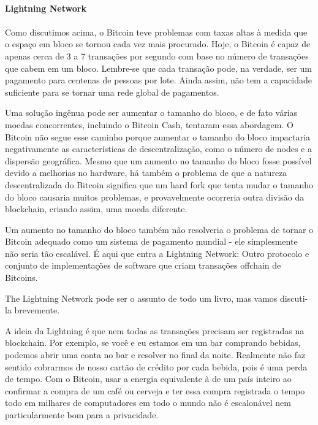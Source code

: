 \paragraph{Lightning Network}
\paragraph{}

Como discutimos acima, o Bitcoin teve problemas com taxas altas à medida que o espaço em bloco se tornou cada vez mais procurado. Hoje, o Bitcoin é capaz de apenas cerca de 3 a 7 transações por segundo com base no número de transações que cabem em um bloco. Lembre-se que cada transação pode, na verdade, ser um pagamento para centenas de pessoas por lote. Ainda assim, não tem a capacidade suficiente para se tornar uma rede global de pagamentos.

Uma solução ingênua pode ser aumentar o tamanho do bloco, e de fato várias moedas concorrentes, incluindo o Bitcoin Cash, tentaram essa abordagem. O Bitcoin não segue esse caminho porque aumentar o tamanho do bloco impactaria negativamente as características de descentralização, como o número de nodes e a dispersão geográfica. Mesmo que um aumento no tamanho do bloco fosse possível devido a melhorias no hardware, há também o problema de que a natureza descentralizada do Bitcoin significa que um hard fork que tenta mudar o tamanho do bloco causaria muitos problemas, e provavelmente ocorreria outra divisão da blockchain, criando assim, uma moeda diferente.

Um aumento no tamanho do bloco também não resolveria o problema de tornar o Bitcoin adequado como um sistema de pagamento mundial - ele simplesmente não seria tão escalável. É aqui que entra a Lightning Network: Outro protocolo e conjunto de implementações de software que criam transações offchain de Bitcoins.
 
The Lightning Network pode ser o assunto de todo um livro, mas vamos discuti-la brevemente.

A ideia da Lightning é que nem todas as transações precisam ser registradas na blockchain. Por exemplo, se você e eu estamos em um bar comprando bebidas, podemos abrir uma conta no bar e resolver no final da noite. Realmente não faz sentido cobrarmos de nosso cartão de crédito por cada bebida, pois é uma perda de tempo. Com o Bitcoin, usar a energia equivalente à de um país inteiro ao confirmar a compra de um café ou cerveja e ter essa compra registrada o tempo todo em milhares de computadores em todo o mundo não é escalonável nem particularmente bom para a privacidade.

